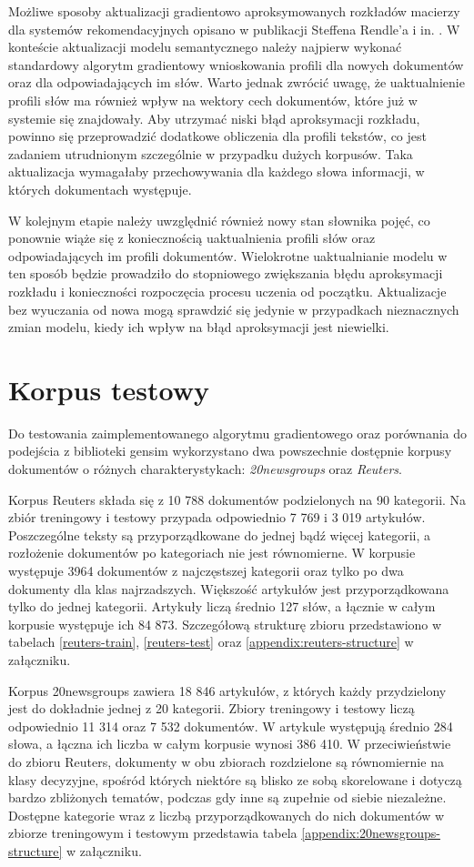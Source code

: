 \documentclass{pracamgr}
\begin{document}
Możliwe sposoby aktualizacji gradientowo aproksymowanych rozkładów macierzy dla systemów rekomendacyjnych opisano w publikacji Steffena Rendle'a i in. \cite{rendle}. W konteście aktualizacji modelu semantycznego należy najpierw wykonać standardowy algorytm gradientowy wnioskowania profili dla nowych dokumentów oraz dla odpowiadających im słów. Warto jednak zwrócić uwagę, że uaktualnienie profili słów ma również wpływ na wektory cech dokumentów, które już w systemie się znajdowały. Aby utrzymać niski błąd aproksymacji rozkładu, powinno się przeprowadzić dodatkowe obliczenia dla profili tekstów, co jest zadaniem utrudnionym szczególnie w przypadku dużych korpusów. Taka aktualizacja wymagałaby przechowywania dla każdego słowa informacji, w których dokumentach występuje. 

W kolejnym etapie należy uwzględnić również nowy stan słownika pojęć, co ponownie wiąże się z koniecznością uaktualnienia profili słów oraz odpowiadających im profili dokumentów. Wielokrotne uaktualnianie modelu w ten sposób będzie prowadziło do stopniowego zwiększania błędu aproksymacji rozkładu i konieczności rozpoczęcia procesu uczenia od początku. Aktualizacje bez wyuczania od nowa mogą sprawdzić się jedynie w przypadkach nieznacznych zmian modelu, kiedy ich wpływ na błąd aproksymacji jest niewielki.

\section{Korpus testowy}
Do testowania zaimplementowanego algorytmu gradientowego oraz porównania do podejścia z biblioteki gensim wykorzystano dwa powszechnie dostępnie korpusy dokumentów o różnych charakterystykach: \textit{20newsgroups} oraz \textit{Reuters}.

Korpus Reuters składa się z 10 788 dokumentów podzielonych na 90 kategorii. Na zbiór treningowy i testowy przypada odpowiednio 7 769 i 3 019 artykułów. Poszczególne teksty są przyporządkowane do jednej bądź więcej kategorii, a rozłożenie dokumentów po kategoriach nie jest równomierne. W korpusie występuje 3964 dokumentów z najczęstszej kategorii oraz tylko po dwa dokumenty dla klas najrzadszych. Większość artykułów jest przyporządkowana tylko do jednej kategorii. Artykuły liczą średnio 127 słów, a łącznie w całym korpusie występuje ich 84 873. Szczegółową strukturę zbioru przedstawiono w tabelach \ref{reuters-train}, \ref{reuters-test} oraz \ref{appendix:reuters-structure} w załączniku. 

Korpus 20newsgroups zawiera 18 846 artykułów, z których każdy przydzielony jest do dokładnie jednej z 20 kategorii. Zbiory treningowy i testowy liczą odpowiednio 11 314 oraz 7 532 dokumentów. W artykule występują średnio 284 słowa, a łączna ich liczba w całym korpusie wynosi 386 410. W przeciwieństwie do zbioru Reuters, dokumenty w obu zbiorach rozdzielone są równomiernie na klasy decyzyjne, spośród których niektóre są blisko ze sobą skorelowane i dotyczą bardzo zbliżonych tematów, podczas gdy inne są zupełnie od siebie niezależne. Dostępne kategorie wraz z liczbą przyporządkowanych do nich dokumentów w zbiorze treningowym i testowym przedstawia tabela \ref{appendix:20newsgroups-structure} w załączniku.
\end{document}
